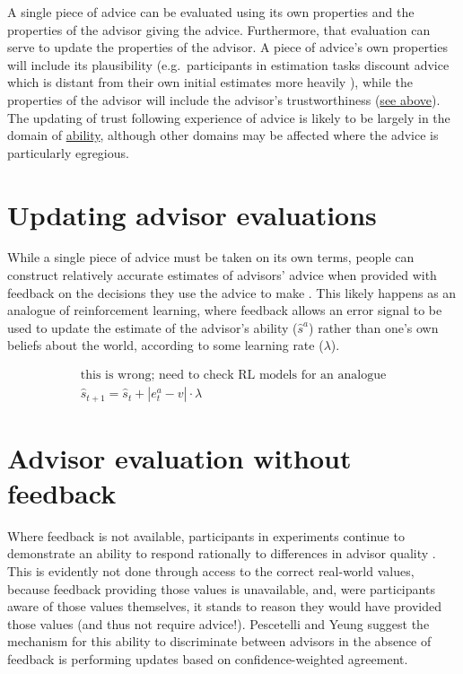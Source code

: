 \documentclass[a4paper, nobind]{templates/ociamthesis}
\begin{document}
A single piece of advice can be evaluated using its own properties and the properties of the advisor giving the advice. Furthermore, that evaluation can serve to update the properties of the advisor. A piece of advice's own properties will include its plausibility (e.g.~participants in estimation tasks discount advice which is distant from their own initial estimates more heavily \autocite{yanivReceivingOtherPeople2004}), while the properties of the advisor will include the advisor's trustworthiness (\protect\hyperlink{three-factor-model-of-trust}{see above}). The updating of trust following experience of advice is likely to be largely in the domain of \protect\hyperlink{ability}{ability}, although other domains may be affected where the advice is particularly egregious.

\hypertarget{updating-advisor-evaluations}{%
\section*{Updating advisor evaluations}\label{updating-advisor-evaluations}}

While a single piece of advice must be taken on its own terms, people can construct relatively accurate estimates of advisors' advice when provided with feedback on the decisions they use the advice to make \autocite{pescetelliUseMetacognitiveSignals2017,sahCheapTalkCredibility2013,yanivAdviceTakingDecision2000}. This likely happens as an analogue of reinforcement learning, where feedback allows an error signal to be used to update the estimate of the advisor's ability (\(\hat{s}^{a}\)) rather than one's own beliefs about the world, according to some learning rate (\(\lambda\)).

\begin{align}
\text{this is wrong; need to check RL models for an analogue}\\
\hat{s}_{t+1} = \hat{s}_{t} + |e^{a}_{t} - v|\cdot\lambda
\label{eq:advisor-evaluation}
\end{align}

\hypertarget{advisor-evaluation-without-feedback}{%
\section*{Advisor evaluation without feedback}\label{advisor-evaluation-without-feedback}}

Where feedback is not available, participants in experiments continue to demonstrate an ability to respond rationally to differences in advisor quality \autocite{pescetelliUseMetacognitiveSignals2017}. This is evidently not done through access to the correct real-world values, because feedback providing those values is unavailable, and, were participants aware of those values themselves, it stands to reason they would have provided those values (and thus not require advice!). Pescetelli and Yeung \autocite*{pescetelliUseMetacognitiveSignals2017} suggest the mechanism for this ability to discriminate between advisors in the absence of feedback is performing updates based on confidence-weighted agreement.
\end{document}
